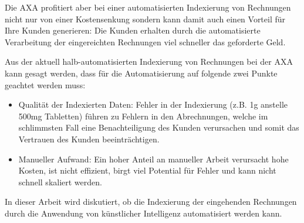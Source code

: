 \documentclass{hwz}
\begin{document}
Die AXA profitiert aber bei einer automatisierten Indexierung von Rechnungen nicht nur von einer Kostensenkung sondern kann damit auch einen Vorteil für Ihre Kunden generieren: Die Kunden erhalten durch die automatisierte Verarbeitung der eingereichten Rechnungen viel schneller das geforderte Geld.




Aus der aktuell halb-automatisierten Indexierung von Rechnungen bei der AXA kann gesagt werden, dass für die Automatisierung auf folgende zwei Punkte geachtet werden muss:

\begin{itemize}
    \item Qualität der Indexierten Daten: Fehler in der Indexierung (z.B. 1g anstelle 500mg Tabletten) führen zu Fehlern in den Abrechnungen, welche im schlimmsten Fall eine Benachteiligung des Kunden verursachen und somit das Vertrauen des Kunden beeinträchtigen.
    \item Manueller Aufwand: Ein hoher Anteil an manueller Arbeit verursacht hohe Kosten, ist nicht effizient, birgt viel Potential für Fehler und kann nicht schnell skaliert werden.
\end{itemize}


In dieser Arbeit wird diskutiert, ob die Indexierung der eingehenden Rechnungen durch die Anwendung von künstlicher Intelligenz automatisiert werden kann.
\end{document}
